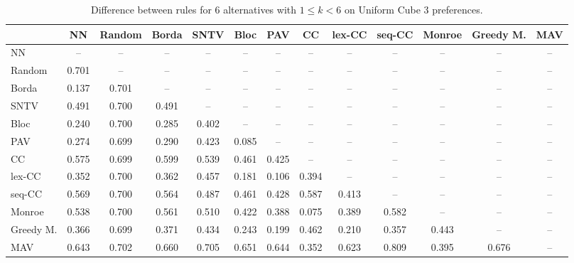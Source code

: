 
\begin{table*}[htbp]
\centering
\begin{tabular}{lcccccccccccc}
\toprule
 & NN & Random & Borda & SNTV & Bloc & PAV & CC & lex-CC & seq-CC & Monroe & Greedy M. & MAV \\
\midrule
NN & -- & -- & -- & -- & -- & -- & -- & -- & -- & -- & -- & -- \\
Random & \cellcolor{blue!70} 0.701 & -- & -- & -- & -- & -- & -- & -- & -- & -- & -- & -- \\
Borda & \cellcolor{blue!13} 0.137 & \cellcolor{blue!70} 0.701 & -- & -- & -- & -- & -- & -- & -- & -- & -- & -- \\
SNTV & \cellcolor{blue!49} 0.491 & \cellcolor{blue!70} 0.700 & \cellcolor{blue!49} 0.491 & -- & -- & -- & -- & -- & -- & -- & -- & -- \\
Bloc & \cellcolor{blue!24} 0.240 & \cellcolor{blue!70} 0.700 & \cellcolor{blue!28} 0.285 & \cellcolor{blue!40} 0.402 & -- & -- & -- & -- & -- & -- & -- & -- \\
PAV & \cellcolor{blue!27} 0.274 & \cellcolor{blue!69} 0.699 & \cellcolor{blue!28} 0.290 & \cellcolor{blue!42} 0.423 & \cellcolor{blue!8} 0.085 & -- & -- & -- & -- & -- & -- & -- \\
CC & \cellcolor{blue!57} 0.575 & \cellcolor{blue!69} 0.699 & \cellcolor{blue!59} 0.599 & \cellcolor{blue!53} 0.539 & \cellcolor{blue!46} 0.461 & \cellcolor{blue!42} 0.425 & -- & -- & -- & -- & -- & -- \\
lex-CC & \cellcolor{blue!35} 0.352 & \cellcolor{blue!70} 0.700 & \cellcolor{blue!36} 0.362 & \cellcolor{blue!45} 0.457 & \cellcolor{blue!18} 0.181 & \cellcolor{blue!10} 0.106 & \cellcolor{blue!39} 0.394 & -- & -- & -- & -- & -- \\
seq-CC & \cellcolor{blue!56} 0.569 & \cellcolor{blue!70} 0.700 & \cellcolor{blue!56} 0.564 & \cellcolor{blue!48} 0.487 & \cellcolor{blue!46} 0.461 & \cellcolor{blue!42} 0.428 & \cellcolor{blue!58} 0.587 & \cellcolor{blue!41} 0.413 & -- & -- & -- & -- \\
Monroe & \cellcolor{blue!53} 0.538 & \cellcolor{blue!70} 0.700 & \cellcolor{blue!56} 0.561 & \cellcolor{blue!51} 0.510 & \cellcolor{blue!42} 0.422 & \cellcolor{blue!38} 0.388 & \cellcolor{blue!7} 0.075 & \cellcolor{blue!38} 0.389 & \cellcolor{blue!58} 0.582 & -- & -- & -- \\
Greedy M. & \cellcolor{blue!36} 0.366 & \cellcolor{blue!69} 0.699 & \cellcolor{blue!37} 0.371 & \cellcolor{blue!43} 0.434 & \cellcolor{blue!24} 0.243 & \cellcolor{blue!19} 0.199 & \cellcolor{blue!46} 0.462 & \cellcolor{blue!21} 0.210 & \cellcolor{blue!35} 0.357 & \cellcolor{blue!44} 0.443 & -- & -- \\
MAV & \cellcolor{blue!64} 0.643 & \cellcolor{blue!70} 0.702 & \cellcolor{blue!66} 0.660 & \cellcolor{blue!70} 0.705 & \cellcolor{blue!65} 0.651 & \cellcolor{blue!64} 0.644 & \cellcolor{blue!35} 0.352 & \cellcolor{blue!62} 0.623 & \cellcolor{blue!80} 0.809 & \cellcolor{blue!39} 0.395 & \cellcolor{blue!67} 0.676 & -- \\
\bottomrule
\end{tabular}

\caption{Difference between rules for 6 alternatives with $1 \leq k < 6$ on Uniform Cube 3 preferences.}
\label{tab:rule_distance_heatmap-m=[6]-pref_dist=euclidean__args__dimensions=3_-_space=uniform_cube}
\end{table*}
    